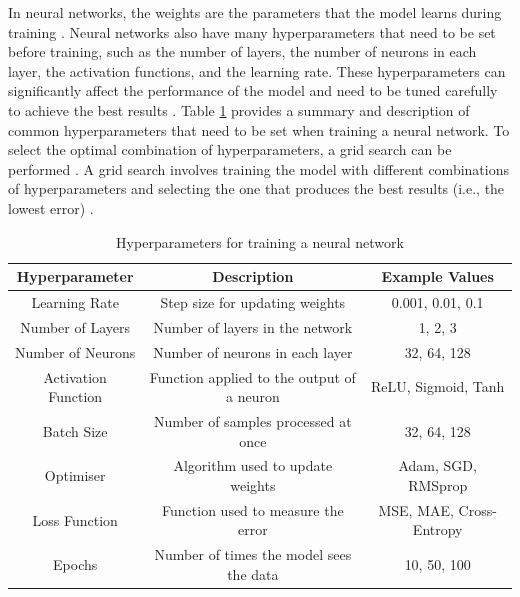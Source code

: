 In neural networks, the weights are the parameters that the model learns during training \cite{gurney2018introduction}. Neural networks also have many hyperparameters that need to be set before training, such as the number of layers, the number of neurons in each layer, the activation functions, and the learning rate. These hyperparameters can significantly affect the performance of the model and need to be tuned carefully to achieve the best results \cite{gurney2018introduction}. Table \ref{tab:hyperparameters} provides a summary and description of common hyperparameters that need to be set when training a neural network. To select the optimal combination of hyperparameters, a grid search can be performed \cite{gurney2018introduction}. A grid search involves training the model with different combinations of hyperparameters and selecting the one that produces the best results (i.e., the lowest error) \cite{gurney2018introduction}.

\begin{table}
    \centering
    \begin{tabular}{|c|c|c|}
    \hline
    Hyperparameter & Description & Example Values \\
    \hline
    Learning Rate & Step size for updating weights & 0.001, 0.01, 0.1 \\
    Number of Layers & Number of layers in the network & 1, 2, 3 \\
    Number of Neurons & Number of neurons in each layer & 32, 64, 128 \\
    Activation Function & Function applied to the output of a neuron & ReLU, Sigmoid, Tanh \\
    Batch Size & Number of samples processed at once & 32, 64, 128 \\
    Optimiser & Algorithm used to update weights & Adam, SGD, RMSprop \\
    Loss Function & Function used to measure the error & MSE, MAE, Cross-Entropy \\
    Epochs & Number of times the model sees the data & 10, 50, 100 \\
    \hline
    \end{tabular}
    \caption{Hyperparameters for training a neural network}
    \label{tab:hyperparameters}
\end{table}

